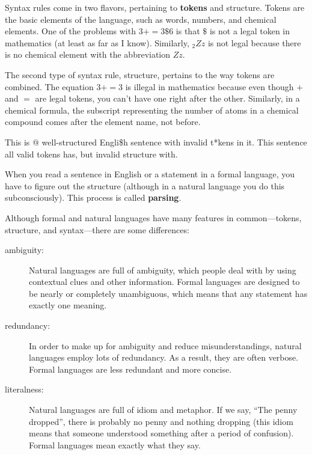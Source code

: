 Syntax rules come in two flavors, pertaining to {\bf tokens} and
structure.  Tokens are the basic elements of the language, such as
words, numbers, and chemical elements.  One of the problems with
$3 += 3 \$ 6$ is that \( \$ \) is not a legal token in mathematics
(at least as far as I know).  Similarly, $_2Zz$ is not legal because
there is no chemical element with the abbreviation $Zz$.

The second type of syntax rule, structure, pertains to the way tokens are
combined.  The equation $3 += 3$ is illegal in mathematics 
because even though $+$ and $=$ are legal tokens, you can't 
have one right after the other. Similarly, in a chemical formula, 
the subscript representing the number of atoms in a 
chemical compound comes after the element name, not before.

This is @ well-structured Engli\$h
sentence with invalid t*kens in it.  This sentence all valid 
tokens has, but invalid structure with.

When you read a sentence in English or a statement in a formal
language, you have to figure out the structure
(although in a natural language you do this subconsciously).  This
process is called {\bf parsing}.

Although formal and natural languages have many features in
common---tokens, structure, and syntax---there are some
differences:

\begin{description}

\item[ambiguity:] Natural languages are full of ambiguity, which
people deal with by using contextual clues and other information.
Formal languages are designed to be nearly or completely unambiguous,
which means that any statement has exactly one meaning. 

\item[redundancy:] In order to make up for ambiguity and reduce
misunderstandings, natural languages employ lots of
redundancy.  As a result, they are often verbose.  Formal languages
are less redundant and more concise.

\item[literalness:] Natural languages are full of idiom and metaphor.
If we say, ``The penny dropped'', there is probably no penny and
nothing dropping (this idiom means that someone understood something
after a period of confusion).  Formal languages
mean exactly what they say.

\end{description}

